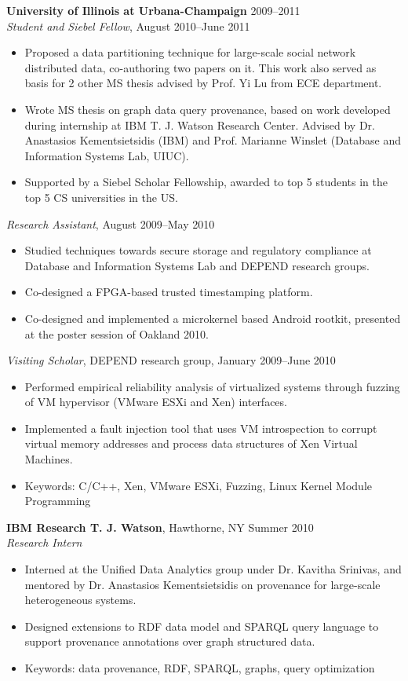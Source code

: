 \documentclass[line,margin]{res}
\begin{document}
\begin{resume}
  \textbf{University of Illinois at Urbana-Champaign} \hfill 2009--2011 \\
  {\sl Student and Siebel Fellow}, August 2010--June 2011
  \begin{itemize}  \itemsep -2pt
  \item Proposed a data partitioning technique for large-scale social network distributed data, co-authoring two papers on it.  This work also served as basis for 2 other MS thesis advised by Prof. Yi Lu from ECE department.
  \item Wrote MS thesis on graph data query provenance, based on work developed during internship at IBM T. J. Watson Research Center. Advised by Dr. Anastasios Kementsietsidis (IBM) and Prof. Marianne Winslet (Database and Information Systems Lab, UIUC).
  \item Supported by a Siebel Scholar Fellowship, awarded to top 5 students in the top 5 CS universities in the US.
  \end{itemize}
  {\sl Research Assistant}, August 2009--May 2010
  \begin{itemize}  \itemsep -2pt
  \item Studied techniques towards secure storage and regulatory compliance at Database and Information Systems Lab and DEPEND research groups.
  \item Co-designed a FPGA-based trusted timestamping platform.
  \item Co-designed and implemented a microkernel based Android rootkit, presented at the poster session of Oakland 2010.
  \end{itemize}
  {\sl Visiting Scholar}, DEPEND research group, January 2009--June 2010
  \begin{itemize}  \itemsep -2pt
  \item Performed empirical reliability analysis of virtualized systems through fuzzing of VM hypervisor (VMware ESXi and Xen) interfaces.
  \item Implemented a fault injection tool that uses VM introspection to corrupt virtual memory addresses and process data structures of Xen Virtual Machines.
  \item Keywords: C/C++, Xen, VMware ESXi, Fuzzing, Linux Kernel Module Programming
  \end{itemize}

  \textbf{IBM Research T. J. Watson}, Hawthorne, NY \hfill Summer 2010 \\
  {\sl Research Intern}
  \begin{itemize}  \itemsep -2pt
  \item Interned at the Unified Data Analytics group under Dr. Kavitha Srinivas, and mentored by Dr. Anastasios Kementsietsidis on provenance for large-scale heterogeneous systems.
  \item Designed extensions to RDF data model and SPARQL query language to support provenance annotations over graph structured data.
  \item Keywords: data provenance, RDF, SPARQL, graphs, query optimization
  \end{itemize}


\end{resume}
\end{document}
